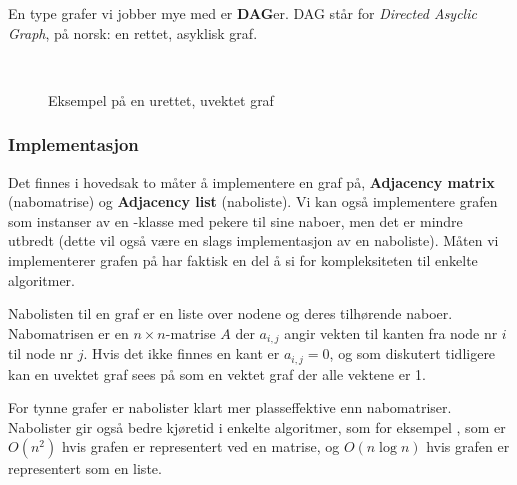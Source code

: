 En type grafer vi jobber mye med er \textbf{DAG}er. DAG står for \emph{Directed Asyclic Graph}, på norsk: en rettet, asyklisk graf. 


\begin{figure}[H]
\centering
\caption{Eksempel på en urettet, uvektet graf}~\\
\label{fig:graf}
\end{figure}


\subsubsection{Implementasjon}
Det finnes i hovedsak to måter å implementere en graf på, \textbf{Adjacency matrix} (nabomatrise) og \textbf{Adjacency list} (naboliste). Vi kan også implementere grafen som instanser av en -klasse med pekere til sine naboer, men det er mindre utbredt (dette vil også være en slags implementasjon av en naboliste). Måten vi implementerer grafen på har faktisk en del å si for kompleksiteten til enkelte algoritmer.

Nabolisten til en graf er en liste over nodene og deres tilhørende naboer. Nabomatrisen er en $ n\times n $-matrise $ A $ der $ a_{i, j} $ angir vekten til kanten fra node nr $ i $ til node nr $ j $. Hvis det ikke finnes en kant er $ a_{i, j} = 0 $, og som diskutert tidligere kan en uvektet graf sees på som en vektet graf der alle vektene er 1.

For tynne grafer er nabolister klart mer plasseffektive enn nabomatriser. Nabolister gir også bedre kjøretid i enkelte algoritmer, som for eksempel , som er $ O(n^2) $ hvis grafen er representert ved en matrise, og $ O(n\log n) $ hvis grafen er representert som en liste.

